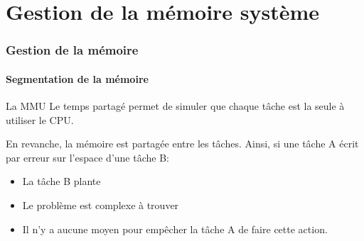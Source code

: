 %
%
%

\part{Gestion de la mémoire système}

\begin{frame}
\partpage
\end{frame}

\begin{frame}
\tableofcontents[currentpart]
\end{frame}


\section{Gestion de la mémoire}

\subsection{Segmentation de la mémoire}

\begin{frame}{La MMU}
  Le temps partagé  permet de simuler que chaque tâche  est la seule à
  utiliser le CPU.

  En revanche, la mémoire est partagée entre les tâches. Ainsi, si une
  tâche A écrit par erreur sur l'espace d'une tâche B:
  \begin{itemize}
  \item  La tâche B plante
  \item  Le problème est complexe à trouver
  \item Il  n'y a  aucune moyen  pour empêcher la  tâche A  de faire
    cette action.
  \end{itemize}
\end{frame}

